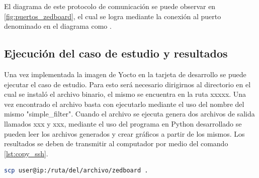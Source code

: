 El diagrama de este protocolo de comunicación se puede observar en \ref{fig:puertos_zedboard}, el cual se logra mediante la conexión al puerto denominado en el diagrama como .


\subsection{Ejecución del caso de estudio y resultados}

Una vez implementada la imagen de Yocto en la tarjeta de desarrollo se puede ejecutar el caso de estudio. Para esto será necesario dirigirnos al directorio en el cual se instaló el archivo binario, el mismo se encuentra en la ruta xxxxx. Una vez encontrado el archivo basta con ejecutarlo mediante el uso del nombre del mismo "simple\_filter". Cuando el archivo se ejecuta genera dos archivos de salida llamados xxx y xxx, mediante el uso del programa en Python desarrollado se pueden leer los archivos generados y crear gráficos a partir de los mismos. Los resultados se deben de transmitir al computador por medio del comando \ref{lst:copy_ssh}.

\begin{lstlisting}[language=bash, caption={Copiar archivo por protocolo SSH, Linux}, label=lst:copy_ssh]
    scp user@ip:/ruta/del/archivo/zedboard .
\end{lstlisting}

